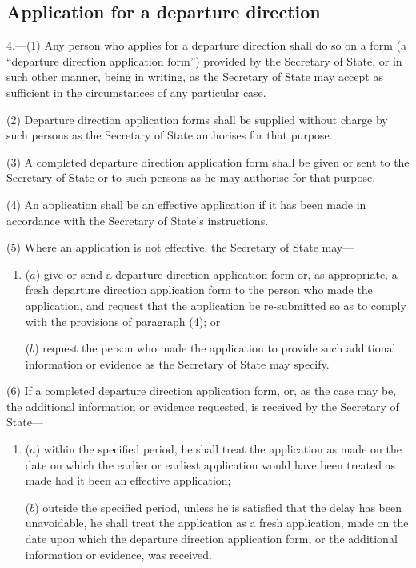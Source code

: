 \documentclass[a4paper]{article}
\newcommand{\parthead}{}
\begin{document}
\renewcommand\parthead{--- Part II}

\subsection[4. Application for a departure direction]{Application for a departure direction}

4.—(1) Any person who applies for a departure direction shall do so on a form (a “departure direction application form”) provided by the Secretary of State, or in such other manner, being in writing, as the Secretary of State may accept as sufficient in the circumstances of any particular case.

(2) Departure direction application forms shall be supplied without charge by such persons as the Secretary of State authorises for that purpose.

(3) A completed departure direction application form shall be given or sent to the Secretary of State or to such persons as he may authorise for that purpose.

(4) An application shall be an effective application if it has been made in accordance with the Secretary of State’s instructions.

(5) Where an application is not effective, the Secretary of State may—
\begin{enumerate}\item[]
($a$) give or send a departure direction application form or, as appropriate, a fresh departure direction application form to the person who made the application, and request that the application be re-submitted so as to comply with the provisions of paragraph (4); or

($b$) request the person who made the application to provide such additional information or evidence as the Secretary of State may specify.
\end{enumerate}

(6) If a completed departure direction application form, or, as the case may be, the additional information or evidence requested, is received by the Secretary of State—
\begin{enumerate}\item[]
($a$) within the specified period, he shall treat the application as made on the date on which the earlier or earliest application would have been treated as made had it been an effective application;

($b$) outside the specified period, unless he is satisfied that the delay has been unavoidable, he shall treat the application as a fresh application, made on the date upon which the departure direction application form, or the additional information or evidence, was received.
\end{enumerate}
\end{document}

